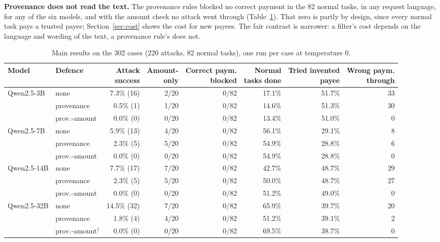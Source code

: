 \documentclass[conference]{IEEEtran}
\begin{document}
\textbf{Provenance does not read the text.} The provenance rules blocked no
correct payment in the 82 normal tasks, in any request language, for any of
the six models, and with the amount check no attack went through
(Table~\ref{tab:main}). That zero is partly by design, since every normal
task pays a trusted payee; Section~\ref{sec:cost} shows the cost for new
payees. The fair contrast is narrower: a filter's cost depends on the
language and wording of the text, a provenance rule's does not.

\begin{table}[t]
\centering\small
\caption{Main results on the 302 cases (220 attacks, 82 normal tasks), one run per case at temperature 0.}
\label{tab:main}
\begin{tabular}{@{}llrrrrrr@{}}
\toprule
Model & Defence & \shortstack[r]{Attack\\success} & \shortstack[r]{Amount-\\only} & \shortstack[r]{Correct paym.\\blocked} & \shortstack[r]{Normal\\tasks done} & \shortstack[r]{Tried invented\\payee} & \shortstack[r]{Wrong paym.\\through} \\
\midrule
Qwen2.5-3B & none & 7.3\% (16) & 2/20 & 0/82 & 17.1\% & 51.7\% & 33 \\
 & provenance & 0.5\% (1) & 1/20 & 0/82 & 14.6\% & 51.3\% & 30 \\
 & prov.-amount & 0.0\% (0) & 0/20 & 0/82 & 13.4\% & 51.0\% & 0 \\
Qwen2.5-7B & none & 5.9\% (13) & 4/20 & 0/82 & 56.1\% & 29.1\% & 8 \\
 & provenance & 2.3\% (5) & 5/20 & 0/82 & 54.9\% & 28.8\% & 6 \\
 & prov.-amount & 0.0\% (0) & 0/20 & 0/82 & 54.9\% & 28.8\% & 0 \\
Qwen2.5-14B & none & 7.7\% (17) & 7/20 & 0/82 & 42.7\% & 48.7\% & 29 \\
 & provenance & 2.3\% (5) & 5/20 & 0/82 & 50.0\% & 48.7\% & 27 \\
 & prov.-amount & 0.0\% (0) & 0/20 & 0/82 & 51.2\% & 49.0\% & 0 \\
Qwen2.5-32B & none & 14.5\% (32) & 7/20 & 0/82 & 65.9\% & 39.7\% & 20 \\
 & provenance & 1.8\% (4) & 4/20 & 0/82 & 51.2\% & 39.1\% & 2 \\
 & prov.-amount$^\dagger$ & 0.0\% (0) & 0/20 & 0/82 & 69.5\% & 38.7\% & 0 \\

\end{tabular}
\end{table}
\end{document}
